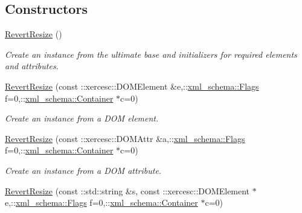 \subsection*{Constructors}
\begin{DoxyCompactItemize}
\item 
\hypertarget{classopenstack_1_1xml_1_1RevertResize_a815f2c1cffb47a2aa8e7d34c55559eeb}{
\hyperlink{classopenstack_1_1xml_1_1RevertResize_a815f2c1cffb47a2aa8e7d34c55559eeb}{RevertResize} ()}
\label{classopenstack_1_1xml_1_1RevertResize_a815f2c1cffb47a2aa8e7d34c55559eeb}

\begin{DoxyCompactList}\small\item\em Create an instance from the ultimate base and initializers for required elements and attributes. \item\end{DoxyCompactList}\item 
\hyperlink{classopenstack_1_1xml_1_1RevertResize_aa598cfa299566e6dcac853483c3f563e}{RevertResize} (const ::xercesc::DOMElement \&e,::\hyperlink{namespacexml__schema_affb4c227cbd9aa7453dd1dc5a1401943}{xml\_\-schema::Flags} f=0,::\hyperlink{namespacexml__schema_a333dea2213742aea47a37532dec4ec27}{xml\_\-schema::Container} $\ast$c=0)
\begin{DoxyCompactList}\small\item\em Create an instance from a DOM element. \item\end{DoxyCompactList}\item 
\hyperlink{classopenstack_1_1xml_1_1RevertResize_a55619f5cdc0d959f371d3ba3859f0a30}{RevertResize} (const ::xercesc::DOMAttr \&a,::\hyperlink{namespacexml__schema_affb4c227cbd9aa7453dd1dc5a1401943}{xml\_\-schema::Flags} f=0,::\hyperlink{namespacexml__schema_a333dea2213742aea47a37532dec4ec27}{xml\_\-schema::Container} $\ast$c=0)
\begin{DoxyCompactList}\small\item\em Create an instance from a DOM attribute. \item\end{DoxyCompactList}\item 
\hyperlink{classopenstack_1_1xml_1_1RevertResize_aee9d7e6a2ec02876dbbcb455c470f792}{RevertResize} (const ::std::string \&s, const ::xercesc::DOMElement $\ast$e,::\hyperlink{namespacexml__schema_affb4c227cbd9aa7453dd1dc5a1401943}{xml\_\-schema::Flags} f=0,::\hyperlink{namespacexml__schema_a333dea2213742aea47a37532dec4ec27}{xml\_\-schema::Container} $\ast$c=0)

\end{DoxyCompactItemize}
